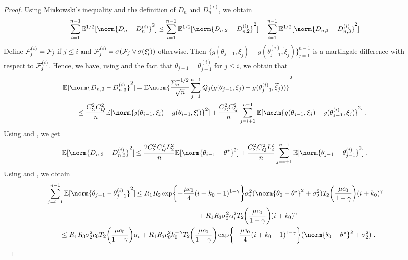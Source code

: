 \begin{proof}
Using Minkowski's inequality and the definition of $D_n$ and $D_n^{(i)}$, we obtain 
\begin{equation}
    \sum_{i=1}^{n-1}\PE^{1/2}[\norm{D_n-D_n^{(i)}}^2] \leq \sum_{i=1}^{n-1}\PE^{1/2}[\norm{D_{n,2}-D_{n,2}^{(i)}}^2] +\sum_{i=1}^{n-1}\PE^{1/2}[\norm{D_{n,3}-D_{n,3}^{(i)}}^2] 
\end{equation}
 Define $\mathcal{F}_j^{(i)} = \mathcal{F}_j$ if $j\leq i$ and $\mathcal{F}_j^{(i)} = \sigma(\mathcal{F}_j \vee \sigma(\xi_i'))$ otherwise. Then $\{g(\theta_{j-1},\xi_j)-g(\theta_{j-1}^{(i)},\widetilde{\xi}_j)\}_{j=1}^{n-1}$ is a martingale difference with respect to $\mathcal{F}_j^{(i)}$. Hence, we have, using  and the fact that $\theta_{j-1} = \theta_{j-1}^{(i)}$ for $j \leq i$, we obtain that 
 \begin{align}
&\PE[\norm{D_{n,3}-D_{n,3}^{(i)}}^2] = \PE\norm{\frac{\Sigma_n^{-1/2}}{\sqrt{n}}\sum_{j=1}^{n-1}Q_j(g(\theta_{j-1},\xi_j)-g(\theta_{j-1}^{(i)},\widetilde{\xi}_j))}^2 \\
&\qquad \leq \frac{C_{\Sigma}^2C_Q^2}{n}\PE[\norm{g(\theta_{i-1},\xi_i)-g(\theta_{i-1},\xi_i')}^2] +\frac{C_{\Sigma}^2C_Q^2}{n}\sum_{j=i+1}^{n-1}\PE[\norm{g(\theta_{j-1},\xi_j)-g(\theta_{j-1}^{(i)},\xi_j)}^2]\eqsp.
\end{align}
   Using  and , we get 
   \begin{equation}
       \PE[\norm{D_{n,3}-D_{n,3}^{(i)}}^2] \leq \frac{2C_{\Sigma}^2C_Q^2L_2^2}{n}\PE[\norm{\theta_{i-1}-\thetas}^2] +\frac{C_{\Sigma}^2C_Q^2L_2^2}{n}\sum_{j=i+1}^{n-1}\PE[\norm{\theta_{j-1}-\theta_{j-1}^{(i)}}^2]\eqsp.
   \end{equation}
   Using  and , we obtain 
   \begin{align}
       &\sum_{j=i+1}^{n-1}\PE[\norm{\theta_{j-1}-\theta_{j-1}^{(i)}}^2] \leq R_1R_2\exp\biggl\{-\frac{\mu c_0}{4}(i+k_0-1)^{1-\gamma}\biggr\}\alpha_i^2(\norm{\theta_{0}-\thetas}^2 + \sigma_2^2)T_2\biggl(\frac{\mu c_0}{1-\gamma}\biggr)(i+k_0)^{\gamma} \\ 
      & \qquad \qquad \qquad \qquad \qquad \qquad \qquad \qquad \qquad \qquad \qquad  + R_1R_3\sigma_2^2\alpha_i^2T_2\biggl(\frac{\mu c_0}{1-\gamma}\biggr)(i+k_0)^{\gamma} \\
      & \qquad \leq R_1R_3\sigma_2^2c_0T_2\biggl(\frac{\mu c_0}{1-\gamma}\biggr)\alpha_i + R_1R_2c_0^2k_0^{-\gamma}T_2\biggl(\frac{\mu c_0}{1-\gamma}\biggr)\exp\biggl\{-\frac{\mu c_0}{4}(i+k_0-1)^{1-\gamma}\biggr\}(\norm{\theta_{0}-\thetas}^2+\sigma_2^2)\eqsp.

\end{align}
\end{proof}
